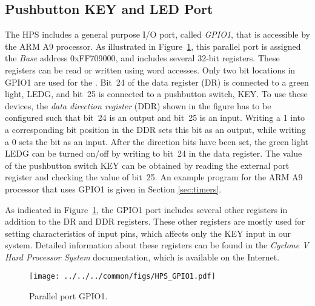 \subsection{Pushbutton KEY and LED Port}
\label{sec:hps_gpio1}
The HPS includes a general purpose I/O port, called {\it GPIO1}, that is accessible by the
ARM A9 processor.  As illustrated in Figure~\ref{fig:gpio1}, this parallel 
port is assigned the {\it Base} address {\sf 0xFF709000}, and includes several 32-bit registers.
These registers can be read or written using word accesses.
Only two bit locations in GPIO1 are used for the \systemName. Bit~24 of the data
register (DR) is connected to
a green light, LEDG, and bit~25 is connected to a pushbutton switch, KEY. To use these
devices, the {\it data direction register} (DDR) shown in the figure has to be configured such 
that bit~24 is an output and bit~25 is an input. Writing a 1 into a corresponding bit
position in the DDR sets this bit as an output, while writing a 0 sets the bit as an
input. After the direction bits have been set, the green light LEDG can be turned on/off 
by writing to bit~24 in the data register. The
value of the pushbutton switch KEY can be obtained by reading the external port register
and checking the value 
of bit~25. An example program for the ARM A9 processor that uses GPIO1 is given in Section
\ref{sec:timers}.

As indicated in Figure~\ref{fig:gpio1}, the GPIO1 port includes several other registers in
addition to the DR and DDR registers. These other registers are mostly used for setting
characteristics of input pins, which affects only the KEY input in our system.
Detailed information about these registers can be found in the {\it Cyclone V Hard 
Processor System} documentation, which is available on the Internet.

\begin{figure}[h!]
   \begin{center}
       \texttt{[image: ../../../common/figs/HPS\_GPIO1.pdf]}
   \end{center}
   \caption{Parallel port GPIO1.}
	\label{fig:gpio1}
\end{figure}
